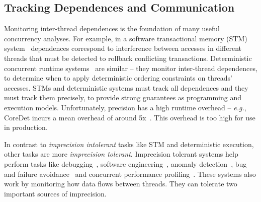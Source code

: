\documentclass[preprint,9pt]{sigplanconf}
\newcommand{\ctraps}{CTraps\xspace}
\begin{document}

\subsection{Tracking Dependences and Communication}
\label{sec:background:comm}

Monitoring inter-thread dependences is the foundation of many useful
concurrency analyses.  For example, in a software transactional memory (STM)
system~\cite{stm} dependences correspond to interference between accesses in
different threads that must be detected to rollback conflicting transactions.
Deterministic concurrent runtime systems~\cite{coredet,grace} are similar --
they monitor inter-thread dependences, to determine when to apply
deterministic ordering constraints on threads' accesses.  STMs and
deterministic systems must track all dependences and they must track them
precisely, to provide strong guarantees as programming and execution models.
Unfortunately, precision has a high runtime overhead -- {\em e.g.},
CoreDet incurs a mean overhead of around 5x~\cite{coredet}.  This overhead is
too high for use in production.  


In contrast to {\em imprecision intolerant} tasks like STM and deterministic
execution, other tasks are more {\em imprecision tolerant}.  Imprecision
tolerant systems help perform tasks like
debugging~\cite{defuse,conseq,recon,bugaboo,raceslicing,fasttrack,falcon},
software engineering~\cite{oshajava,oshatr}, anomaly
detection~\cite{avio,dmtracker,cci,daikon}, bug and failure
avoidance~\cite{aviso,cfix} and concurrent performance
profiling~\cite{threadcriticality,schedpredictionmodel}.  These
systems also work by monitoring how data flows between threads.  They can
tolerate two important sources of imprecision.
\end{document}
